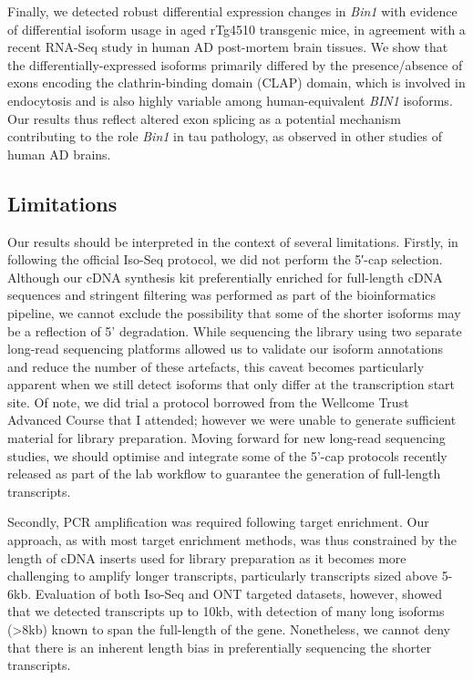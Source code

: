 Finally, we detected robust differential expression changes in \textit{Bin1} with evidence of differential isoform usage in aged rTg4510 transgenic mice, in agreement with a recent RNA-Seq study in human AD post-mortem brain tissues\cite{Marques-Coelho2021}. We show that the differentially-expressed isoforms primarily differed by the presence/absence of exons encoding the clathrin-binding domain (CLAP) domain, which is involved in endocytosis and is also highly variable among human-equivalent \textit{BIN1} isoforms\cite{Taga2020}. Our results thus reflect altered exon splicing as a potential mechanism contributing to the role \textit{Bin1} in tau pathology, as observed in other studies of human AD brains\cite{Marques-Coelho2021, Taga2020}.  


\subsection{Limitations}
Our results should be interpreted in the context of several limitations. Firstly, in following the official Iso-Seq protocol, we did not perform the 5′-cap selection. Although our cDNA synthesis kit preferentially enriched for full-length cDNA sequences and stringent filtering was performed as part of the bioinformatics pipeline, we cannot exclude the possibility that some of the shorter isoforms may be a reflection of 5' degradation. While sequencing the library using two separate long-read sequencing platforms allowed us to validate our isoform annotations and reduce the number of these artefacts, this caveat becomes particularly apparent when we still detect isoforms that only differ at the transcription start site. Of note, we did trial a protocol borrowed from the Wellcome Trust Advanced Course that I attended; however we were unable to generate sufficient material for library preparation. Moving forward for new long-read sequencing studies, we should optimise and integrate some of the 5'-cap protocols recently released as part of the lab workflow to guarantee the generation of full-length transcripts.   

Secondly, PCR amplification was required following target enrichment. Our approach, as with most target enrichment methods, was thus constrained by the length of cDNA inserts used for library preparation as it becomes more challenging to amplify longer transcripts, particularly transcripts sized above 5-6kb. Evaluation of both Iso-Seq and ONT targeted datasets, however, showed that we detected transcripts up to 10kb, with detection of many long isoforms (>8kb) known to span the full-length of the gene. Nonetheless, we cannot deny that there is an inherent length bias in preferentially sequencing the shorter transcripts. 

